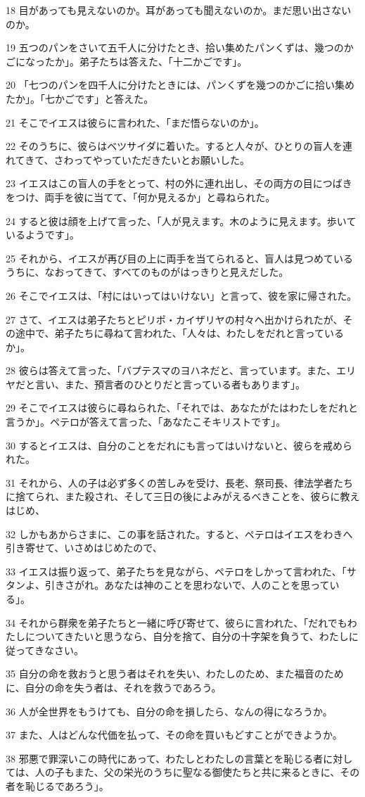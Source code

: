 \par 18 目があっても見えないのか。耳があっても聞えないのか。まだ思い出さないのか。
\par 19 五つのパンをさいて五千人に分けたとき、拾い集めたパンくずは、幾つのかごになったか」。弟子たちは答えた、「十二かごです」。
\par 20 「七つのパンを四千人に分けたときには、パンくずを幾つのかごに拾い集めたか」。「七かごです」と答えた。
\par 21 そこでイエスは彼らに言われた、「まだ悟らないのか」。
\par 22 そのうちに、彼らはベツサイダに着いた。すると人々が、ひとりの盲人を連れてきて、さわってやっていただきたいとお願いした。
\par 23 イエスはこの盲人の手をとって、村の外に連れ出し、その両方の目につばきをつけ、両手を彼に当てて、「何か見えるか」と尋ねられた。
\par 24 すると彼は顔を上げて言った、「人が見えます。木のように見えます。歩いているようです」。
\par 25 それから、イエスが再び目の上に両手を当てられると、盲人は見つめているうちに、なおってきて、すべてのものがはっきりと見えだした。
\par 26 そこでイエスは、「村にはいってはいけない」と言って、彼を家に帰された。
\par 27 さて、イエスは弟子たちとピリポ・カイザリヤの村々へ出かけられたが、その途中で、弟子たちに尋ねて言われた、「人々は、わたしをだれと言っているか」。
\par 28 彼らは答えて言った、「バプテスマのヨハネだと、言っています。また、エリヤだと言い、また、預言者のひとりだと言っている者もあります」。
\par 29 そこでイエスは彼らに尋ねられた、「それでは、あなたがたはわたしをだれと言うか」。ペテロが答えて言った、「あなたこそキリストです」。
\par 30 するとイエスは、自分のことをだれにも言ってはいけないと、彼らを戒められた。
\par 31 それから、人の子は必ず多くの苦しみを受け、長老、祭司長、律法学者たちに捨てられ、また殺され、そして三日の後によみがえるべきことを、彼らに教えはじめ、
\par 32 しかもあからさまに、この事を話された。すると、ペテロはイエスをわきへ引き寄せて、いさめはじめたので、
\par 33 イエスは振り返って、弟子たちを見ながら、ペテロをしかって言われた、「サタンよ、引きさがれ。あなたは神のことを思わないで、人のことを思っている」。
\par 34 それから群衆を弟子たちと一緒に呼び寄せて、彼らに言われた、「だれでもわたしについてきたいと思うなら、自分を捨て、自分の十字架を負うて、わたしに従ってきなさい。
\par 35 自分の命を救おうと思う者はそれを失い、わたしのため、また福音のために、自分の命を失う者は、それを救うであろう。
\par 36 人が全世界をもうけても、自分の命を損したら、なんの得になろうか。
\par 37 また、人はどんな代価を払って、その命を買いもどすことができようか。
\par 38 邪悪で罪深いこの時代にあって、わたしとわたしの言葉とを恥じる者に対しては、人の子もまた、父の栄光のうちに聖なる御使たちと共に来るときに、その者を恥じるであろう」。


